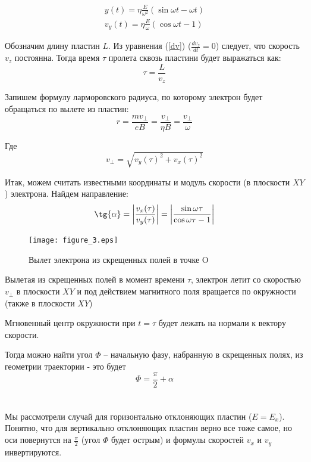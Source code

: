 \begin{gather}
	y(t)=\eta\frac{E}{\omega^2}(\sin{\omega{t}}-\omega{t})\\
	v_y(t)=\eta\frac{E}{\omega}(\cos\omega{t}-1)
\end{gather}

Обозначим длину пластин $L$. Из уравнения (\ref{dv}) ($\frac{dv_z}{dt}=0$) следует, что скорость $v_z$ постоянна. Тогда время $\tau$ пролета сквозь пластини будет выражаться как:
\begin{equation}
	\tau=\frac{L}{v_z}
\end{equation}

Запишем формулу ларморовского радиуса, по которому электрон будет обращаться по вылете из пластин:
\begin{equation}
	r=\frac{mv_\perp}{eB}=\frac{v_\perp}{\eta{B}}=\frac{v_\perp}{\omega}
\end{equation}

Где 
\begin{equation}
	v_\perp=\sqrt{v_y(\tau)^2+v_x(\tau)^2}
\end{equation}

Итак, можем считать известными координаты и модуль скорости (в плоскости $XY$) электрона. Найдем направление:
\begin{equation}
	\tg{\alpha}=\left|\frac{v_x(\tau)}{v_y(\tau)}\right|=\left|\frac{\sin{\omega{\tau}}}{\cos\omega{\tau}-1}\right|
\end{equation}

\begin{figure}
	\texttt{[image: figure\_3.eps]}
	\caption{Вылет электрона из скрещенных полей в точке O}
	\label{fig:figure1}
\end{figure}


Вылетая из скрещенных полей в момент времени $\tau$, электрон летит со скоростью $v_\perp$ в плоскости $XY$ и под действием магнитного поля вращается по окружности (также в плоскости $XY$)

Мгновенный центр окружности при $t=\tau$ будет лежать на нормали к вектору скорости.

Тогда можно найти угол $\Phi$ -- начальную фазу, набранную в скрещенных полях, из геометрии траектории - это будет $$\Phi=\frac{\pi}{2}+\alpha$$
%
\\
\\
%
Мы рассмотрели случай для горизонтально отклоняющих пластин ($E=E_x$). Понятно, что для вертикально отклоняющих пластин верно все тоже самое, но оси повернутся на $\frac{\pi}{2}$ (угол $\Phi$ будет острым) и формулы скоростей $v_x$ и $v_y$ инвертируются. 

